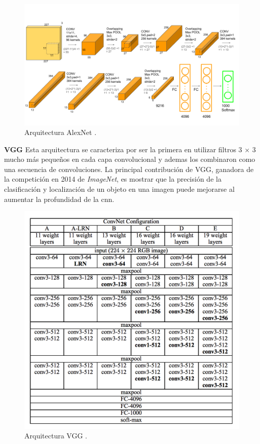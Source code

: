 \begin{figure}[H]
 \centering
  \includegraphics[scale=0.4,keepaspectratio=true,clip=true]{imagenes/MarcoTeorico/AlexNet-1.png}
  \caption{Arquitectura AlexNet \citep{alexnet}.}
	\label{Fig:alexnet}
\end{figure}


\par \textbf{VGG} \citep{vgg} Esta arquitectura se caracteriza por ser la primera en utilizar filtros 3 × 3 mucho más pequeños en cada capa convolucional y ademas los combinaron como una secuencia de convoluciones. La principal contribución de VGG, ganadora de la competición en 2014 de \textit{ImageNet}, es mostrar que la precisión de la clasificación y localización de un objeto en una imagen puede mejorarse al aumentar la profundidad de la \ac{cnn}.

\begin{figure}[H]
 \centering
  \includegraphics[scale=0.6,keepaspectratio=true,clip=true]{imagenes/MarcoTeorico/vgg.png}
  \caption{Arquitectura VGG \citep{vgg}.}
	\label{Fig:vgg}
\end{figure}

